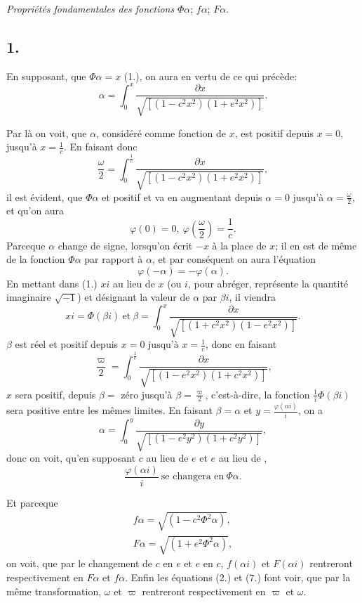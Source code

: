 \documentclass{article}
\begin{document}
\emph{Propriétés fondamentales des fonctions} $\Phi\alpha$; $f\alpha$; $F\alpha$.

\subsection*{1.}

En supposant, que $\Phi\alpha=x$ (1.), on aura en vertu de ce qui précède:
\[ \alpha=\int_{0}^{x}\frac{\partial x}{\sqrt{[(1-c^{2}x^{2})(1+e^{2}x^{2})]}}. \tag{2.} \]

Par là on voit, que $\alpha$, considéré comme fonction de $x$, est positif depuis $x=0$, jusqu'à $x=\frac{1}{c}$. En faisant donc
\[ \frac{\omega}{2}=\int_{0}^{\frac{1}{c}}\frac{\partial x}{\sqrt{[(1-c^{2}x^{2})(1+e^{2}x^{2})]}}, \tag{3.} \]
il est évident, que $\Phi\alpha$ et positif et va en augmentant depuis $\alpha=0$ jusqu'à $\alpha=\frac{\omega}{2}$, et qu'on aura
\[ \varphi(0)=0,\ \varphi\left(\frac{\omega}{2}\right)=\frac{1}{c}. \tag{4.} \]
Parceque $\alpha$ change de signe, lorsqu'on écrit $-x$ à la place de $x$; il en est de même de la fonction $\Phi\alpha$ par rapport à $\alpha$, et par conséquent on aura l'équation
\[ \varphi(-\alpha)=-\varphi(\alpha). \tag{5.} \]
En mettant dans (1.) $xi$ au lieu de $x$ (ou $i$, pour abréger, représente la quantité imaginaire $\sqrt{-1}$) et désignant la valeur de $\alpha$ par $\beta i$, il viendra
\[ xi=\Phi(\beta i)\ \text{et}\ \beta=\int_{0}^{x}\frac{\partial x}{\sqrt{[(1+c^{2}x^{2})(1-e^{2}x^{2})]}}. \tag{6.} \]
$\beta$ est réel et positif depuis $x=0$ jusqu'à $x=\frac{1}{e}$, donc en faisant
\[ \frac{\varpi}{2}=\int_{0}^{\frac{1}{e}}\frac{\partial x}{\sqrt{[(1-e^{2}x^{2})(1+c^{2}x^{2})]}}, \tag{7.} \]
$x$ sera positif, depuis $\beta=$ zéro jusqu'à $\beta=\frac{\varpi}{2}$, c'est-à-dire, la fonction $\frac{1}{i}\Phi(\beta i)$ sera positive entre les mêmes limites. En faisant $\beta=\alpha$ et $y=\frac{\varphi(\alpha i)}{i}$, on a
\[ \alpha=\int_{0}^{y}\frac{\partial y}{\sqrt{[(1-e^{2}y^{2})(1+c^{2}y^{2})]}}, \]
donc on voit, qu'en supposant $c$ au lieu de $e$ et $e$ au lieu de \uncertain{$\varepsilon$},
\[ \frac{\varphi(\alpha i)}{i}\ \text{se changera en}\ \Phi\alpha. \]

Et parceque
\[ \begin{gathered} f\alpha=\sqrt{(1-c^{2}\Phi^{2}\alpha)},\\ F\alpha=\sqrt{(1+e^{2}\Phi^{2}\alpha)}, \end{gathered} \]
on voit, que par le changement de $c$ en $e$ et $e$ en $c$, $f(\alpha i)$ et $F(\alpha i)$ rentreront respectivement en $F\alpha$ et $f\alpha$. Enfin les équations (2.) et (7.) font voir, que par la même transformation, $\omega$ et $\varpi$ rentreront respectivement en $\varpi$ et $\omega$.
\end{document}
